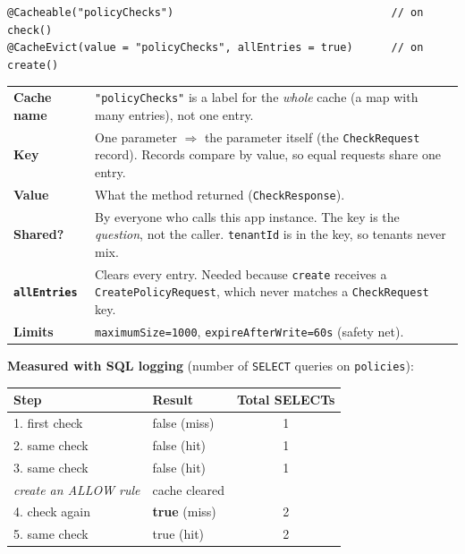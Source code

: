 \documentclass[11pt,a4paper]{article}
\newcommand{\code}[1]{\texttt{\small #1}}
\begin{document}
\begin{lstlisting}
@Cacheable("policyChecks")                                  // on check()
@CacheEvict(value = "policyChecks", allEntries = true)      // on create()
\end{lstlisting}

\begin{tabular}{@{}p{3.6cm}p{12.2cm}@{}}
\toprule
\textbf{Cache name} & \code{"policyChecks"} is a label for the \emph{whole} cache (a map with many entries), not one entry. \\
\textbf{Key} & One parameter $\Rightarrow$ the parameter itself (the \code{CheckRequest} record). Records compare by value, so equal requests share one entry. \\
\textbf{Value} & What the method returned (\code{CheckResponse}). \\
\textbf{Shared?} & By everyone who calls this app instance. The key is the \emph{question}, not the caller. \code{tenantId} is in the key, so tenants never mix. \\
\textbf{\code{allEntries}} & Clears every entry. Needed because \code{create} receives a \code{CreatePolicyRequest}, which never matches a \code{CheckRequest} key. \\
\textbf{Limits} & \code{maximumSize=1000}, \code{expireAfterWrite=60s} (safety net). \\
\bottomrule
\end{tabular}

\textbf{Measured with SQL logging} (number of \code{SELECT} queries on \code{policies}):

\begin{center}
\begin{tabular}{@{}llc@{}}
\toprule
\textbf{Step} & \textbf{Result} & \textbf{Total SELECTs} \\
\midrule
1. first check & false (miss) & 1 \\
2. same check & false (hit) & 1 \\
3. same check & false (hit) & 1 \\
\emph{create an ALLOW rule} & cache cleared & \\
4. check again & \textbf{true} (miss) & 2 \\
5. same check & true (hit) & 2 \\
\bottomrule
\end{tabular}
\end{center}
\end{document}
